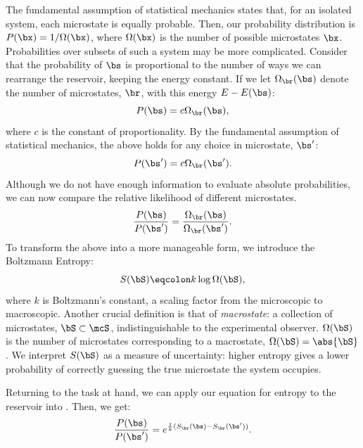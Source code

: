 The fundamental assumption of statistical mechanics states that, for
an isolated system, each microstate is equally probable. Then, our
probability distribution is $P(\bx)=1/\Omega(\bx)$, where
$\Omega(\bx)$ is the number of possible microstates
$\bx$. Probabilities over subsets of such a system may be more
complicated. Consider that the probability of $\bs$ is proportional to
the number of ways we can rearrange the reservoir, keeping the energy
constant. If we let $\Omega_{\br}(\bs)$ denote the number of
microstates, $\br$, with this energy $E-E(\bs)$:
\begin{equation}%
  P(\bs)=c \Omega_{\br}(\bs),
\end{equation}%
where $c$ is the constant of proportionality. By the fundamental
assumption of statistical mechanics, the above holds for any choice in
microstate, $\bs'$:
\begin{equation}%
  P(\bs')=c \Omega_{\br}(\bs').
\end{equation}%
Although we do not have enough information to evaluate absolute
probabilities, we can now compare the relative likelihood of different
microstates.
\begin{equation}%
  \frac{P(\bs)}{P(\bs')}=\frac{\Omega_{\br}(\bs)}{\Omega_{\br}(\bs')}.\label{eq:prob-ratios}
\end{equation}%
To transform the above into a more manageable form, we introduce the
Boltzmann Entropy:%
\begin{equation}%
  S(\bS)\eqcolon k \log \Omega(\bS),\label{eq:boltzmann-entropy}
\end{equation}%
where $k$ is Boltzmann's constant, a scaling factor from the
microscopic to macroscopic. Another crucial definition is that of
\textit{macrostate}: a collection of microstates, $\bS\subset \mcS$,
indistinguishable to the experimental observer.  $\Omega(\bS)$ is the
number of microstates corresponding to a macrostate,
$\Omega(\bS)=\abs{\bS}$. We interpret $S(\bS)$ as a measure of
uncertainty: higher entropy gives a lower probability of correctly
guessing the true microstate the system occupies.

Returning to the task at hand, we can apply our equation for entropy
to the reservoir into . Then, we get:%
\begin{equation}%
  \frac{P(\bs)}{P(\bs')}=e^{\frac{1}{k}(S_{\br}(\bs)-S_{\br}(\bs'))}.\label{eq:boltzmann-entropy-difference}
\end{equation}%

